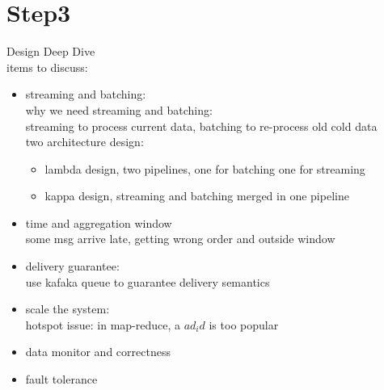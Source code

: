 \documentclass{article}
\begin{document}
\section{Step3}
Design Deep Dive\\
items to discuss:
\begin{itemize}
    \item streaming and batching:\\
    why we need streaming and batching:\\
    streaming to process current data, batching to re-process old cold data\\
    two architecture design:
    \begin{itemize}
        \item lambda design, two pipelines, one for batching one for streaming
        \item kappa design, streaming and batching merged in one pipeline
    \end{itemize}
    \item time and aggregation window\\
    some msg arrive late, getting wrong order and outside window
    \item delivery guarantee:\\
    use kafaka queue to guarantee delivery semantics
    \item scale the system:\\
    hotspot issue: in map-reduce, a $ad_id$ is too popular
    \item data monitor and correctness
    \item fault tolerance
\end{itemize}
\end{document}
